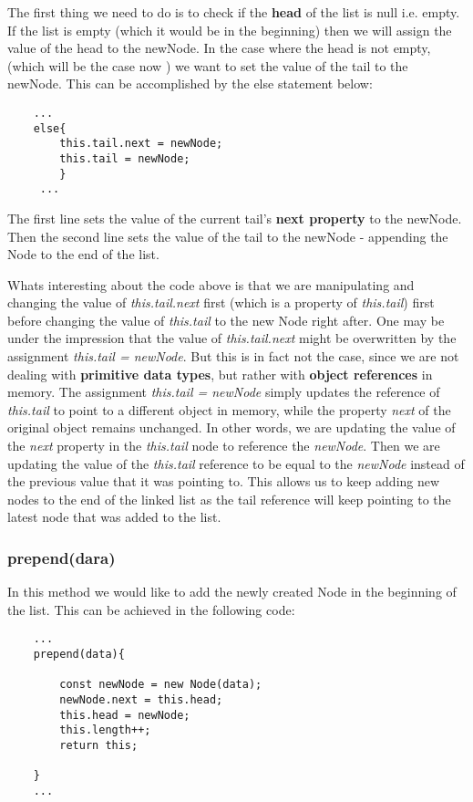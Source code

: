 \documentclass{article}
\begin{document}
The first thing we need to do is to check if the \textbf{head} of the list is null i.e. empty. If the list is empty (which it would be in the beginning) then we will assign the value of the head to the newNode.
In the case where the head is not empty, (which will be the case now ) we want to set the value of the tail to the newNode. This can be accomplished by the else statement below:

\begin{verbatim}
    ...
    else{
        this.tail.next = newNode;
        this.tail = newNode;
        }
     ...
\end{verbatim}

The first line sets the value of the current tail's \textbf{next property} to the newNode. Then the second line sets the value of the tail to the newNode - appending the Node to the end of the list.

Whats interesting about the code above is that we are manipulating and changing the value of \textit{this.tail.next} first (which is a property of \textit{this.tail}) first before changing the value of \textit{this.tail} to the new Node right after. 
One may be under the impression that the value of \textit{this.tail.next} might be overwritten by the assignment \textit{this.tail = newNode}. But this is in fact not the case, since we are not dealing with \textbf{primitive data types}, but rather with \textbf{object references} in memory. 
The assignment \textit{this.tail = newNode} simply updates the reference of \textit{this.tail} to point to a different object in memory, while the property \textit{next} of the original object remains unchanged.
In other words, we are updating the value of the \textit{next} property in the \textit{this.tail} node to reference the \textit{newNode}. Then we are updating the value of the \textit{this.tail} reference to be equal to the \textit{newNode} instead of the previous value that it was pointing to. This allows us to keep adding new nodes to the end of the linked list as the tail reference will keep pointing to the latest node that was added to the list.

\subsubsection{prepend(dara)}

In this method we would like to add the newly created Node in the beginning of the list. This can be achieved in the following code:

\begin{verbatim}
    ...
    prepend(data){
    
        const newNode = new Node(data);
        newNode.next = this.head;
        this.head = newNode;
        this.length++;
        return this;

    }
    ...

\end{verbatim}
\end{document}
